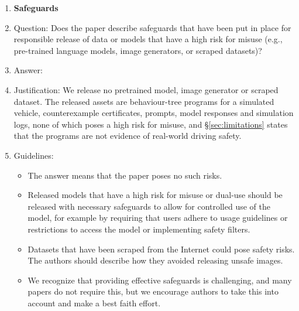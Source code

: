 \begin{enumerate}
\item {\bf Safeguards}
    \item[] Question: Does the paper describe safeguards that have been put in place for responsible release of data or models that have a high risk for misuse (e.g., pre-trained language models, image generators, or scraped datasets)?
    \item[] Answer: \answerNA{}
    \item[] Justification: We release no pretrained model, image generator or scraped dataset. The released assets are behaviour-tree programs for a simulated vehicle, counterexample certificates, prompts, model responses and simulation logs, none of which poses a high risk for misuse, and \S\ref{sec:limitations} states that the programs are not evidence of real-world driving safety.
    \item[] Guidelines:
    \begin{itemize}
        \item The answer \answerNA{} means that the paper poses no such risks.
        \item Released models that have a high risk for misuse or dual-use should be released with necessary safeguards to allow for controlled use of the model, for example by requiring that users adhere to usage guidelines or restrictions to access the model or implementing safety filters.
        \item Datasets that have been scraped from the Internet could pose safety risks. The authors should describe how they avoided releasing unsafe images.
        \item We recognize that providing effective safeguards is challenging, and many papers do not require this, but we encourage authors to take this into account and make a best faith effort.
    \end{itemize}


\end{enumerate}
